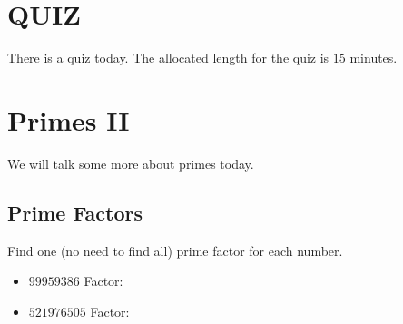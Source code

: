 \documentclass[a4paper,10pt]{article}
\begin{document}
\section{QUIZ}
There is a quiz today. The allocated length for the quiz is $15$ minutes.

\section{Primes II}
We will talk some more about primes today.

\subsection{Prime Factors}
Find one (no need to find all) prime factor for each number.

\begin{itemize}
\item $99959386$ \hfill Factor: \underline{\hspace{2em}}
\item $521976505$ \hfill Factor: \underline{\hspace{2em}}
\end{itemize}
\end{document}
